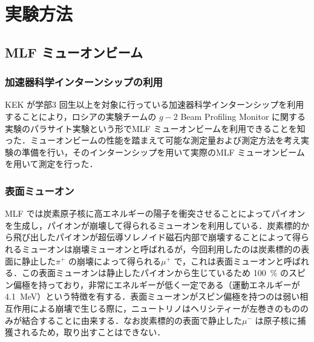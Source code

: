 



%

\section{実験方法}

\subsection{MLF ミューオンビーム}

\subsubsection{加速器科学インターンシップの利用}
KEK が学部3 回生以上を対象に行っている加速器科学インターンシップを利用することにより，ロシアの実験チームの $g - 2$ Beam Profiling Monitor に関する実験のパラサイト実験という形でMLF ミューオンビームを利用できることを知った．ミューオンビームの性能を踏まえて可能な測定量および測定方法を考え実験の準備を行い，そのインターンシップを用いて実際のMLF ミューオンビームを用いて測定を行った．

 \subsubsection{表面ミューオン}
 MLF では炭素原子核に高エネルギーの陽子を衝突させることによってパイオンを生成し，パイオンが崩壊して得られるミューオンを利用している．炭素標的から飛び出したパイオンが超伝導ソレノイド磁石内部で崩壊することによって得られるミューオンは崩壊ミューオンと呼ばれるが，今回利用したのは炭素標的の表面に静止した$\pi^{+}$ の崩壊によって得られる$\mu ^{+}$ で，これは表面ミューオンと呼ばれる．この表面ミューオンは静止したパイオンから生じているため 100~\% のスピン偏極を持っており，非常にエネルギーが低く一定である（運動エネルギーが4.1~MeV）という特徴を有する．表面ミューオンがスピン偏極を持つのは弱い相互作用による崩壊で生じる際に，ニュートリノはヘリシティーが左巻きのもののみが結合することに由来する．なお炭素標的の表面で静止した$\mu^-$ は原子核に捕獲されるため，取り出すことはできない．


